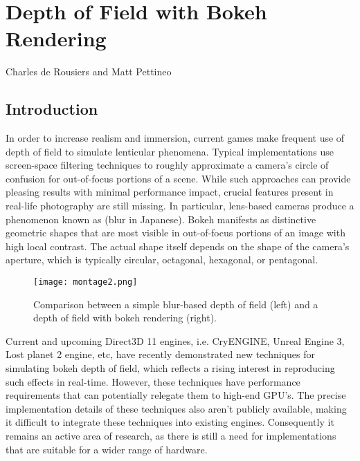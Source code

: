 \chapter{Depth of Field with Bokeh Rendering}{Charles de Rousiers and Matt Pettineo}
\label{BokehRendering}

\section{Introduction}

In order to increase realism and immersion, current games make frequent use of depth of field to simulate lenticular phenomena. Typical implementations use screen-space filtering techniques to roughly approximate a camera's circle of confusion for out-of-focus portions of a scene. While such approaches can provide pleasing results with minimal performance impact, crucial features present in real-life photography are still missing. In particular, lens-based cameras produce a phenomenon known as \bokeh{} (blur in Japanese). Bokeh manifests as distinctive geometric shapes that are most visible in out-of-focus portions of an image with high local contrast. The actual shape itself depends on the shape of the camera’s aperture, which is typically circular, octagonal, hexagonal, or pentagonal.

	\begin{figure}[htb]\centering
	\texttt{[image: montage2.png]}
	\caption{Comparison between a simple blur-based depth of field (left) and a depth of field with bokeh rendering (right). }
	\label{Derousiers:blurcomparison}
	\end{figure}

Current and upcoming Direct3D 11 engines, i.e. CryENGINE, Unreal Engine 3, Lost planet 2 engine, etc, have recently demonstrated new techniques for simulating bokeh depth of field, which reflects a rising interest in reproducing such effects in real-time. However, these techniques have performance requirements that can potentially relegate them to high-end GPU's. The precise implementation details of these techniques also aren't publicly available, making it difficult to integrate these techniques into existing engines. Consequently it remains an active area of research, as there is still a need for implementations that are suitable for a wider range of hardware.

